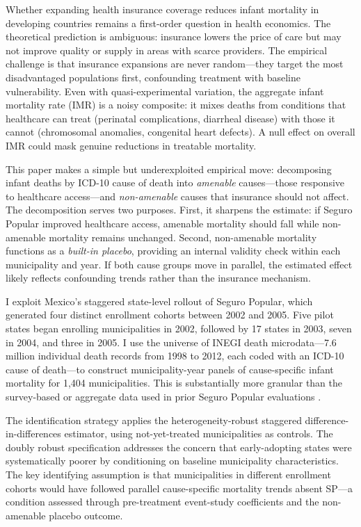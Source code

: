 \documentclass[12pt]{article}
\begin{document}
Whether expanding health insurance coverage reduces infant mortality in developing countries remains a first-order question in health economics. The theoretical prediction is ambiguous: insurance lowers the price of care but may not improve quality or supply in areas with scarce providers. The empirical challenge is that insurance expansions are never random---they target the most disadvantaged populations first, confounding treatment with baseline vulnerability. Even with quasi-experimental variation, the aggregate infant mortality rate (IMR) is a noisy composite: it mixes deaths from conditions that healthcare can treat (perinatal complications, diarrheal disease) with those it cannot (chromosomal anomalies, congenital heart defects). A null effect on overall IMR could mask genuine reductions in treatable mortality.

This paper makes a simple but underexploited empirical move: decomposing infant deaths by ICD-10 cause of death into \textit{amenable} causes---those responsive to healthcare access---and \textit{non-amenable} causes that insurance should not affect. The decomposition serves two purposes. First, it sharpens the estimate: if Seguro Popular improved healthcare access, amenable mortality should fall while non-amenable mortality remains unchanged. Second, non-amenable mortality functions as a \textit{built-in placebo}, providing an internal validity check within each municipality and year. If both cause groups move in parallel, the estimated effect likely reflects confounding trends rather than the insurance mechanism.

I exploit Mexico's staggered state-level rollout of Seguro Popular, which generated four distinct enrollment cohorts between 2002 and 2005. Five pilot states began enrolling municipalities in 2002, followed by 17 states in 2003, seven in 2004, and three in 2005. I use the universe of INEGI death microdata---7.6 million individual death records from 1998 to 2012, each coded with an ICD-10 cause of death---to construct municipality-year panels of cause-specific infant mortality for 1,404 municipalities. This is substantially more granular than the survey-based or aggregate data used in prior Seguro Popular evaluations \citep{king2009, pfutze2014}.

The identification strategy applies the \citet{callaway2021} heterogeneity-robust staggered difference-in-differences estimator, using not-yet-treated municipalities as controls. The doubly robust specification addresses the concern that early-adopting states were systematically poorer by conditioning on baseline municipality characteristics. The key identifying assumption is that municipalities in different enrollment cohorts would have followed parallel cause-specific mortality trends absent SP---a condition assessed through pre-treatment event-study coefficients and the non-amenable placebo outcome.
\end{document}

